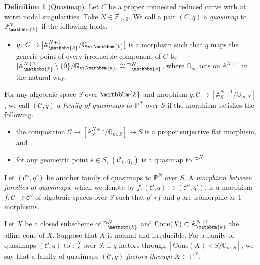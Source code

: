 \documentclass[12pt,twoside]{amsart}
\theoremstyle{definition}
\newtheorem{defn}[thm]{Definition}
\begin{document}
\begin{defn}[Quasimap]\label{defn-qmaps}
    Let $C$ be a proper connected reduced curve with at worst nodal singularities.
Take $N\in\mathbb{Z}_{>0}$. We call a pair $(C,q)$ a {\it quasimap} to $\mathbb{P}_{\mathbbm{k}}^N$ if the following holds.
\begin{itemize}
    \item $q\colon C\to [\mathbb{A}_{\mathbbm{k}}^{N+1}/\mathbb{G}_{m,\mathbbm{k}}]$ is a morphism such that $q$ maps the generic point of every irreducible component of $C$ to $[\mathbb{A}_{\mathbbm{k}}^{N+1}\setminus\{0\}/\mathbb{G}_{m,\mathbbm{k}}]\cong\mathbb{P}_{\mathbbm{k}}^N$, where $\mathbb{G}_m$ acts on $\mathbb{A}^{N+1}$ in the natural way.
\end{itemize}


For any algebraic space $S$ over $\mathbbm{k}$ and morphism $q\colon \mathcal{C}\to[\mathbb{A}_S^{N+1}/\mathbb{G}_{m,S}]$, we call $(\mathcal{C},q)$ a {\it family of quasimaps to $\mathbb{P}^N$} over $S$ if the morphism satisfies the following. 
\begin{itemize}
\item the composition $\mathcal{C} \to[\mathbb{A}_S^{N+1}/\mathbb{G}_{m,S}] \to S$ is a proper surjective flat morphism, and
    \item for any geometric point $\bar{s}\in S$, $(\mathcal{C}_{\bar{s}},q_{\bar{s}})$ is a quasimap to $\mathbb{P}^{N}$.
\end{itemize}
Let $(\mathcal{C}',q')$ be another family of quasimaps to $\mathbb{P}^N$ over $S$.
A {\it morphism between families of quasimaps}, which we denote by $f\colon (\mathcal{C},q)\to (\mathcal{C}',q')$, is a morphism $f\colon \mathcal{C}\to \mathcal{C}'$ of algebraic spaces over $S$ such that $q'\circ f$ and $q$ are isomorphic as $1$-morphisms.

Let $X$ be a closed subscheme of $\mathbb{P}_{\mathbbm{k}}^N$ and $\mathrm{Cone}(X)\subset \mathbb{A}_{\mathbbm{k}}^{N+1}$ the affine cone of $X$.
Suppose that $X$ is normal and irreducible.
For a family of quasimaps $(\mathcal{C},q)$ to $\mathbb{P}_S^{N}$ over $S$, if $q$ factors through $[\mathrm{Cone}(X)\times S/\mathbb{G}_{m,S}]$, we say that a family of quasimaps $(\mathcal{C},q)$ {\it factors through} $X\subset \mathbb{P}^N$.




\end{defn}
\end{document}

